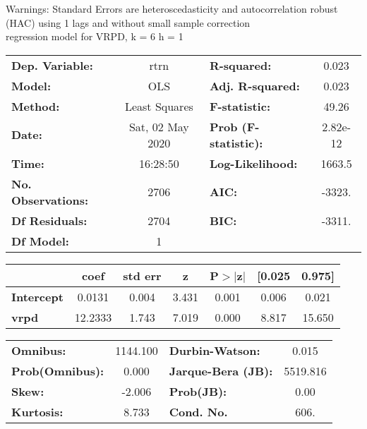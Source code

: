 Warnings: \newline
 [1] Standard Errors are heteroscedasticity and autocorrelation robust (HAC) using 1 lags and without small sample correction\\ 

regression model for VRPD, k = 6 h = 1\begin{center}
\begin{tabular}{lclc}
\toprule
\textbf{Dep. Variable:}    &       rtrn       & \textbf{  R-squared:         } &     0.023   \\
\textbf{Model:}            &       OLS        & \textbf{  Adj. R-squared:    } &     0.023   \\
\textbf{Method:}           &  Least Squares   & \textbf{  F-statistic:       } &     49.26   \\
\textbf{Date:}             & Sat, 02 May 2020 & \textbf{  Prob (F-statistic):} &  2.82e-12   \\
\textbf{Time:}             &     16:28:50     & \textbf{  Log-Likelihood:    } &    1663.5   \\
\textbf{No. Observations:} &        2706      & \textbf{  AIC:               } &    -3323.   \\
\textbf{Df Residuals:}     &        2704      & \textbf{  BIC:               } &    -3311.   \\
\textbf{Df Model:}         &           1      & \textbf{                     } &             \\
\bottomrule
\end{tabular}
\begin{tabular}{lcccccc}
                   & \textbf{coef} & \textbf{std err} & \textbf{z} & \textbf{P$> |$z$|$} & \textbf{[0.025} & \textbf{0.975]}  \\
\midrule
\textbf{Intercept} &       0.0131  &        0.004     &     3.431  &         0.001        &        0.006    &        0.021     \\
\textbf{vrpd}      &      12.2333  &        1.743     &     7.019  &         0.000        &        8.817    &       15.650     \\
\bottomrule
\end{tabular}
\begin{tabular}{lclc}
\textbf{Omnibus:}       & 1144.100 & \textbf{  Durbin-Watson:     } &    0.015  \\
\textbf{Prob(Omnibus):} &   0.000  & \textbf{  Jarque-Bera (JB):  } & 5519.816  \\
\textbf{Skew:}          &  -2.006  & \textbf{  Prob(JB):          } &     0.00  \\
\textbf{Kurtosis:}      &   8.733  & \textbf{  Cond. No.          } &     606.  \\
\bottomrule
\end{tabular}
\end{center}

